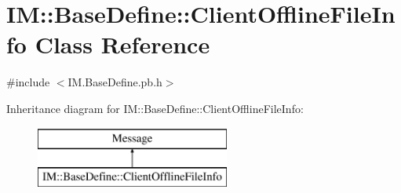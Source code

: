 \hypertarget{class_i_m_1_1_base_define_1_1_client_offline_file_info}{}\section{I\+M\+:\+:Base\+Define\+:\+:Client\+Offline\+File\+Info Class Reference}
\label{class_i_m_1_1_base_define_1_1_client_offline_file_info}


{\ttfamily \#include $<$I\+M.\+Base\+Define.\+pb.\+h$>$}

Inheritance diagram for I\+M\+:\+:Base\+Define\+:\+:Client\+Offline\+File\+Info\+:\begin{figure}[H]
\begin{center}
\leavevmode
\includegraphics[height=2.000000cm]{class_i_m_1_1_base_define_1_1_client_offline_file_info}
\end{center}
\end{figure}
